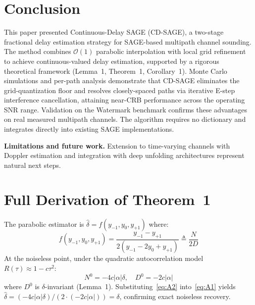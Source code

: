 \documentclass[a4paper,fleqn]{cas-dc}
\newcommand{\bigO}{\mathcal{O}}
\begin{document}
\section{Conclusion}
\label{sec:conclusion}

This paper presented Continuous-Delay SAGE (CD-SAGE), a two-stage fractional delay estimation strategy for SAGE-based multipath channel sounding. The method combines $\bigO(1)$ parabolic interpolation with local grid refinement to achieve continuous-valued delay estimation, supported by a rigorous theoretical framework (Lemma~1, Theorem~1, Corollary~1). Monte Carlo simulations and per-path analysis demonstrate that CD-SAGE eliminates the grid-quantization floor and resolves closely-spaced paths via iterative E-step interference cancellation, attaining near-CRB performance across the operating SNR range. Validation on the Watermark benchmark confirms these advantages on real measured multipath channels. The algorithm requires no dictionary and integrates directly into existing SAGE implementations.

\textbf{Limitations and future work.} Extension to time-varying channels with Doppler estimation and integration with deep unfolding architectures represent natural next steps.

\appendix
\section{Full Derivation of Theorem~1}
\label{app:theorem1}

The parabolic estimator is $\hat{\delta} = f(y_{-1}, y_0, y_{+1})$ where:
\begin{equation}
f(y_{-1}, y_0, y_{+1}) = \frac{y_{-1} - y_{+1}}{2(y_{-1} - 2y_0 + y_{+1})} \triangleq \frac{N}{2D}
\label{eq:A1}
\end{equation}
At the noiseless point, under the quadratic autocorrelation model $R(\tau) \approx 1 - c\tau^2$:
\begin{equation}
N^0 = -4c|\alpha|\delta, \quad D^0 = -2c|\alpha|
\label{eq:A2}
\end{equation}
where $D^0$ is $\delta$-invariant (Lemma~1). Substituting~\eqref{eq:A2} into~\eqref{eq:A1} yields $\hat{\delta} = (-4c|\alpha|\delta) / (2 \cdot (-2c|\alpha|)) = \delta$, confirming exact noiseless recovery.
\end{document}
